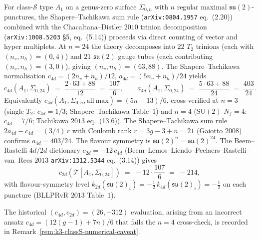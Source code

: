 \begin{proposition}[Class-\texorpdfstring{$\mathcal{S}$}{S} \texorpdfstring{$A_1$}{A-1} anomaly arithmetic at \texorpdfstring{$n = 24$}{n = 24}]
\label{prop:k3-chacaltana-distler-24}
For class-$\mathcal{S}$ type $A_1$ on a genus-zero surface $\Sigma_{0,n}$ with
$n$ regular maximal $\mathfrak{su}(2)$-punctures, the Shapere--Tachikawa
sum rule (\texttt{arXiv:0804.1957} eq.~(2.20)) combined with the
Chacaltana--Distler $2010$ trinion decomposition
(\texttt{arXiv:1008.5203} \S5, eq.~(5.14)) proceeds via direct
counting of vector and hyper multiplets.
At $n = 24$ the theory decomposes into $22$ $T_2$ trinions (each
with $(n_v, n_h) = (0, 4)$) and $21$ $\mathfrak{su}(2)$ gauge tubes
(each contributing $(n_v, n_h) = (3, 0)$), giving
$(n_v, n_h) = (63, 88)$. The Shapere--Tachikawa normalisation
$c_{4d} = (2 n_v + n_h)/12$, $a_{4d} = (5 n_v + n_h)/24$ yields
\[
 c_{4d}(A_1, \Sigma_{0,24}) \;=\; \frac{2\cdot 63 + 88}{12} \;=\; \frac{107}{6},
 \qquad
 a_{4d}(A_1, \Sigma_{0,24}) \;=\; \frac{5\cdot 63 + 88}{24} \;=\; \frac{403}{24}.
\]
Equivalently $c_{4d}(A_1, \Sigma_{0,n}, \mathrm{all\ max}) = (5n-13)/6$,
cross-verified at $n = 3$ (single $T_2$: $c_{4d} = 1/3$;
Shapere--Tachikawa Table~1) and $n = 4$ ($\mathrm{SU}(2)$ $N_f = 4$:
$c_{4d} = 7/6$; Tachikawa $2013$ eq.~(13.6)). The Shapere--Tachikawa
sum rule $2 a_{4d} - c_{4d} = (3/4)\,r$ with Coulomb rank
$r = 3g - 3 + n = 21$ (Gaiotto $2008$) confirms $a_{4d} = 403/24$.
The flavour symmetry is $\mathfrak{su}(2)^n = \mathfrak{su}(2)^{24}$. The Beem--Rastelli
$4d/2d$ dictionary $c_{2d} = -12\, c_{4d}$
(Beem--Lemos--Liendo--Peelaers--Rastelli--van~Rees $2013$
\texttt{arXiv:1312.5344} eq.~(3.14)) gives
\[
 c_{2d}(\mathcal{T}[A_1,\Sigma_{0,24}])
 \;=\;
 -12\cdot \frac{107}{6}
 \;=\;
 -214,
\]
with flavour-symmetry level $k_{2d}(\mathfrak{su}(2)_i) =
-\tfrac{1}{2}\,k_{4d}(\mathfrak{su}(2)_i) = -\tfrac{1}{2}$ on each
puncture (BLLPRvR $2013$ Table~$1$).

The historical $(c_{4d}, c_{2d}) = (26, -312)$ evaluation, arising
from an incorrect ansatz $c_{4d} = (12(g-1) + 7n)/6$ that fails the
$n = 4$ cross-check, is recorded in
Remark~\ref{rem:k3-classS-numerical-caveat}.
\end{proposition}


